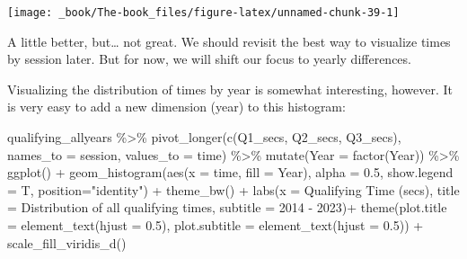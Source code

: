 \documentclass[
]{book}
\newenvironment{Shaded}{\begin{snugshade}}{\end{snugshade}}
\newcommand{\AttributeTok}[1]{\textcolor[rgb]{0.77,0.63,0.00}{#1}}
\newcommand{\FloatTok}[1]{\textcolor[rgb]{0.00,0.00,0.81}{#1}}
\newcommand{\FunctionTok}[1]{\textcolor[rgb]{0.00,0.00,0.00}{#1}}
\newcommand{\NormalTok}[1]{#1}
\newcommand{\SpecialCharTok}[1]{\textcolor[rgb]{0.00,0.00,0.00}{#1}}
\newcommand{\StringTok}[1]{\textcolor[rgb]{0.31,0.60,0.02}{#1}}
\begin{document}
\begin{center}\texttt{[image: \_book/The-book\_files/figure-latex/unnamed-chunk-39-1]} \end{center}

A little better, but\ldots{} not great. We should revisit the best way to visualize times by session later. But for now, we will shift our focus to yearly differences.

Visualizing the distribution of times by year is somewhat interesting, however. It is very easy to add a new dimension (year) to this histogram:

\begin{Shaded}
\begin{Highlighting}[]
\NormalTok{qualifying\_allyears }\SpecialCharTok{\%\textgreater{}\%}
  \FunctionTok{pivot\_longer}\NormalTok{(}\FunctionTok{c}\NormalTok{(}\StringTok{\textquotesingle{}Q1\_secs\textquotesingle{}}\NormalTok{, }\StringTok{\textquotesingle{}Q2\_secs\textquotesingle{}}\NormalTok{, }\StringTok{\textquotesingle{}Q3\_secs\textquotesingle{}}\NormalTok{),}
               \AttributeTok{names\_to =} \StringTok{\textquotesingle{}session\textquotesingle{}}\NormalTok{,}
               \AttributeTok{values\_to =} \StringTok{\textquotesingle{}time\textquotesingle{}}\NormalTok{) }\SpecialCharTok{\%\textgreater{}\%}
  \FunctionTok{mutate}\NormalTok{(}\AttributeTok{Year =} \FunctionTok{factor}\NormalTok{(Year)) }\SpecialCharTok{\%\textgreater{}\%}
  \FunctionTok{ggplot}\NormalTok{() }\SpecialCharTok{+}
  \FunctionTok{geom\_histogram}\NormalTok{(}\FunctionTok{aes}\NormalTok{(}\AttributeTok{x =}\NormalTok{ time, }\AttributeTok{fill =}\NormalTok{ Year),}
                 \AttributeTok{alpha =} \FloatTok{0.5}\NormalTok{, }\AttributeTok{show.legend =}\NormalTok{ T,}
                 \AttributeTok{position=}\StringTok{"identity"}\NormalTok{) }\SpecialCharTok{+}
  \FunctionTok{theme\_bw}\NormalTok{() }\SpecialCharTok{+}
  \FunctionTok{labs}\NormalTok{(}\AttributeTok{x =} \StringTok{\textquotesingle{}Qualifying Time (secs)\textquotesingle{}}\NormalTok{,}
       \AttributeTok{title =} \StringTok{\textquotesingle{}Distribution of all qualifying times\textquotesingle{}}\NormalTok{,}
       \AttributeTok{subtitle =} \StringTok{\textquotesingle{}2014 {-} 2023\textquotesingle{}}\NormalTok{)}\SpecialCharTok{+}
  \FunctionTok{theme}\NormalTok{(}\AttributeTok{plot.title =} \FunctionTok{element\_text}\NormalTok{(}\AttributeTok{hjust =} \FloatTok{0.5}\NormalTok{),}
        \AttributeTok{plot.subtitle =} \FunctionTok{element\_text}\NormalTok{(}\AttributeTok{hjust =} \FloatTok{0.5}\NormalTok{)) }\SpecialCharTok{+}
  \FunctionTok{scale\_fill\_viridis\_d}\NormalTok{()}
\end{Highlighting}
\end{Shaded}
\end{document}
